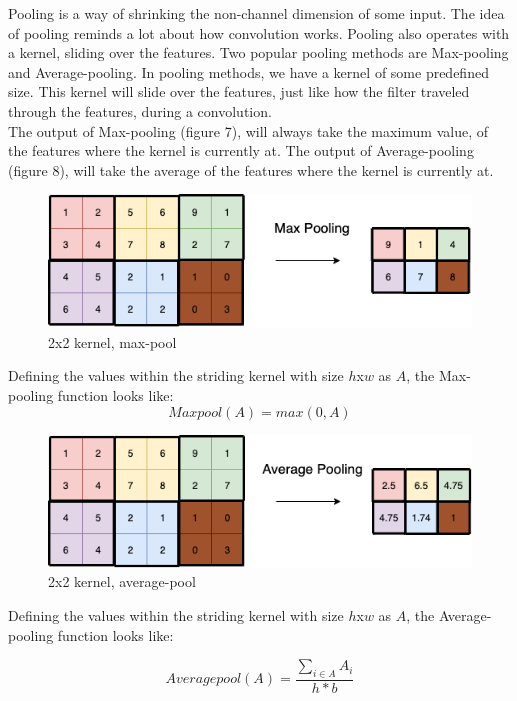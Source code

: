Pooling is a way of shrinking the non-channel dimension of some input. The idea of pooling reminds a lot about how convolution works. Pooling also operates with a kernel, sliding over the features. Two popular pooling methods are Max-pooling and Average-pooling. In pooling methods, we have a kernel of some predefined size. This kernel will slide over the features, just like how the filter traveled through the features, during a convolution. \\

\noindent
The output of Max-pooling (figure 7), will always take the maximum value, of the features where the kernel is currently at. The output of Average-pooling (figure 8), will take the average of the features where the kernel is currently at. \\


\begin{figure}[!ht]
  \centering
  \includegraphics[scale=0.4]{latex/imgs/maxpooling.png}
  \caption{2x2 kernel, max-pool}\label{Baseline:before}
\end{figure}

\noindent
Defining the values within the striding kernel with size $h$x$w$ as $A$, the Max-pooling function looks like:
$$
Maxpool(A) = max(0,A)
$$

\begin{figure}[!ht]
  \centering
  \includegraphics[scale=0.4]{latex/imgs/averagepooling.png}
  \caption{2x2 kernel, average-pool}\label{Baseline:before}
\end{figure}

\noindent
Defining the values within the striding kernel with size $h$x$w$ as $A$, the Average-pooling function looks like:

$$
Averagepool(A) = \frac{\sum_{i \in A} A_i}{h * b}
$$
